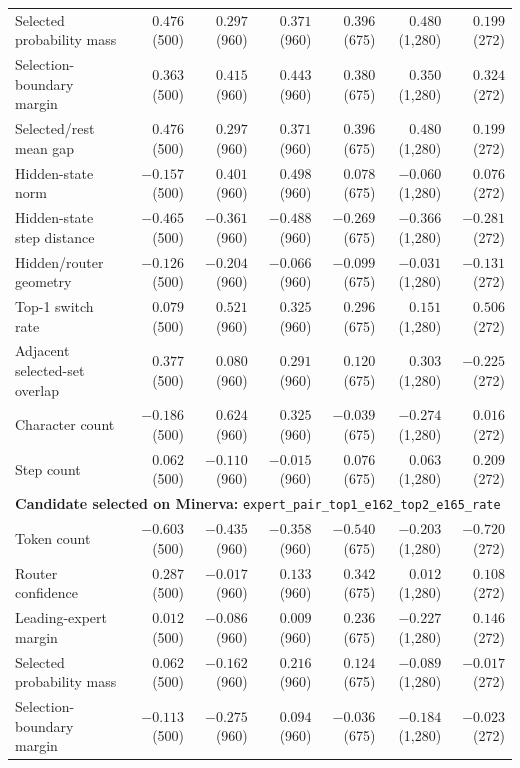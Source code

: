 \begin{longtable}{@{}lrrrrrr@{}}
Selected probability mass & $0.476$ (500) & $0.297$ (960) & $0.371$ (960) & $0.396$ (675) & $0.480$ (1,280) & $0.199$ (272) \\
Selection-boundary margin & $0.363$ (500) & $0.415$ (960) & $0.443$ (960) & $0.380$ (675) & $0.350$ (1,280) & $0.324$ (272) \\
Selected/rest mean gap & $0.476$ (500) & $0.297$ (960) & $0.371$ (960) & $0.396$ (675) & $0.480$ (1,280) & $0.199$ (272) \\
Hidden-state norm & $-0.157$ (500) & $0.401$ (960) & $0.498$ (960) & $0.078$ (675) & $-0.060$ (1,280) & $0.076$ (272) \\
Hidden-state step distance & $-0.465$ (500) & $-0.361$ (960) & $-0.488$ (960) & $-0.269$ (675) & $-0.366$ (1,280) & $-0.281$ (272) \\
Hidden/router geometry & $-0.126$ (500) & $-0.204$ (960) & $-0.066$ (960) & $-0.099$ (675) & $-0.031$ (1,280) & $-0.131$ (272) \\
Top-1 switch rate & $0.079$ (500) & $0.521$ (960) & $0.325$ (960) & $0.296$ (675) & $0.151$ (1,280) & $0.506$ (272) \\
Adjacent selected-set overlap & $0.377$ (500) & $0.080$ (960) & $0.291$ (960) & $0.120$ (675) & $0.303$ (1,280) & $-0.225$ (272) \\
Character count & $-0.186$ (500) & $0.624$ (960) & $0.325$ (960) & $-0.039$ (675) & $-0.274$ (1,280) & $0.016$ (272) \\
Step count & $0.062$ (500) & $-0.110$ (960) & $-0.015$ (960) & $0.076$ (675) & $0.063$ (1,280) & $0.209$ (272) \\
\midrule
\multicolumn{7}{l}{\textbf{Candidate selected on Minerva:} \texttt{expert\_pair\_top1\_e162\_top2\_e165\_rate}} \\
Token count & $-0.603$ (500) & $-0.435$ (960) & $-0.358$ (960) & $-0.540$ (675) & $-0.203$ (1,280) & $-0.720$ (272) \\
Router confidence & $0.287$ (500) & $-0.017$ (960) & $0.133$ (960) & $0.342$ (675) & $0.012$ (1,280) & $0.108$ (272) \\
Leading-expert margin & $0.012$ (500) & $-0.086$ (960) & $0.009$ (960) & $0.236$ (675) & $-0.227$ (1,280) & $0.146$ (272) \\
Selected probability mass & $0.062$ (500) & $-0.162$ (960) & $0.216$ (960) & $0.124$ (675) & $-0.089$ (1,280) & $-0.017$ (272) \\
Selection-boundary margin & $-0.113$ (500) & $-0.275$ (960) & $0.094$ (960) & $-0.036$ (675) & $-0.184$ (1,280) & $-0.023$ (272) \\

\end{longtable}
